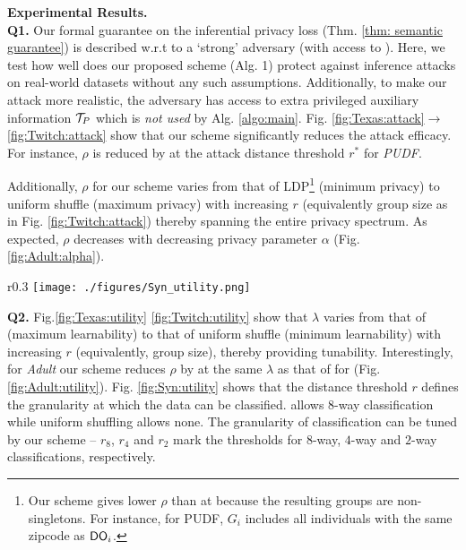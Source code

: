 \textbf{Experimental Results.}
\\\textbf{Q1.} Our formal guarantee on the inferential privacy loss (Thm. \ref{thm: semantic guarantee}) is described w.r.t to a `strong' adversary (with access to  ). Here, we test how well does our proposed scheme (Alg. 1) protect against inference attacks on real-world datasets without any such assumptions. Additionally, to make our attack more realistic, the adversary has access to extra privileged auxiliary information $\mathcal{T}_P$ which is \textit{not used} by Alg. \ref{algo:main}.  Fig. \ref{fig:Texas:attack}$\rightarrow$ \ref{fig:Twitch:attack} show  that our scheme significantly reduces the attack efficacy. For instance, $\rho$ is reduced by \scalebox{1}{$2.7X$} at the attack distance threshold $r^*$ for \textit{PUDF}.

Additionally, $\rho$ for our scheme varies from that of \textsf{LDP}\footnote{Our scheme gives lower $\rho$ than \ldp at \scalebox{1}{$r=0$} because the resulting groups are non-singletons. For instance, for PUDF, $G_i$ includes all individuals with the same zipcode as $\textsf{DO}_i$.} (minimum privacy)   to uniform shuffle (maximum privacy) with increasing $r$ (equivalently group size as in Fig. \ref{fig:Twitch:attack}) thereby spanning the entire privacy spectrum. As expected, $\rho$ decreases with decreasing privacy parameter $\alpha$ (Fig. \ref{fig:Adult:alpha}).

\begin{wrapfigure}{r}{0.3\linewidth}
    \centering
    \texttt{[image: ./figures/Syn\_utility.png]} 
    \caption{\textit{Syn}: Learnability}%
    \label{fig:Syn:utility}
\end{wrapfigure} 

\textbf{Q2.} Fig.\ref{fig:Texas:utility} \scalebox{1}{$\rightarrow$} \ref{fig:Twitch:utility} show that $\lambda$ varies from that of \ldp (maximum learnability) to that of uniform shuffle (minimum learnability) with increasing $r$ (equivalently, group size), thereby providing tunability.  Interestingly, for \textit{Adult} our scheme reduces $\rho$ by \scalebox{1}{$1.7X$} at the same $\lambda$ as that of \ldp for \scalebox{1}{$r=1$} (Fig. \ref{fig:Adult:utility}). Fig. \ref{fig:Syn:utility} shows that the distance threshold $r$ defines the granularity at which the data can be classified. \ldp allows 8-way classification while uniform shuffling allows none. The granularity of classification can be tuned by our scheme -- $r_8$, $r_4$ and $r_2$ mark the thresholds for $8$-way, $4$-way and $2$-way classifications, respectively. %

